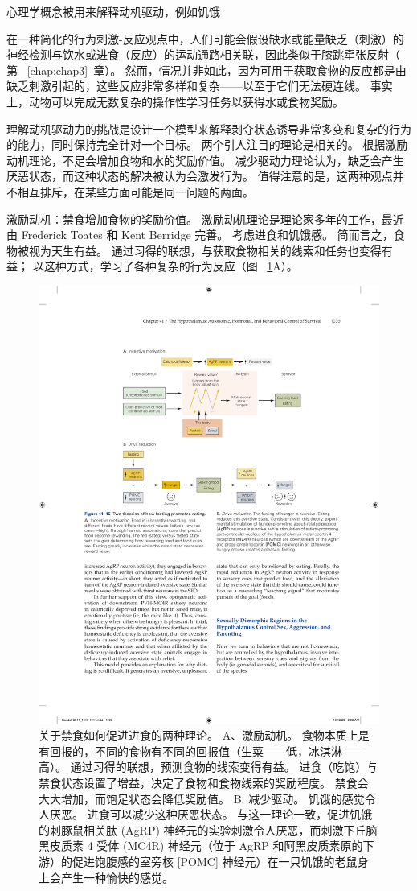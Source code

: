 心理学概念被用来解释动机驱动，例如饥饿

在一种简化的行为刺激-反应观点中，人们可能会假设缺水或能量缺乏（刺激）的神经检测与饮水或进食（反应）的运动通路相关联，因此类似于膝跳牵张反射（ 第 ~\ref{chap:chap3}~章）。
然而，情况并非如此，因为可用于获取食物的反应都是由缺乏刺激引起的，这些反应非常多样和复杂——以至于它们无法硬连线。
事实上，动物可以完成无数复杂的操作性学习任务以获得水或食物奖励。


理解动机驱动力的挑战是设计一个模型来解释剥夺状态诱导非常多变和复杂的行为的能力，同时保持完全针对一个目标。 两个引人注目的理论是相关的。
根据激励动机理论，不足会增加食物和水的奖励价值。 减少驱动力理论认为，缺乏会产生厌恶状态，而这种状态的解决被认为会激发行为。
值得注意的是，这两种观点并不相互排斥，在某些方面可能是同一问题的两面。


激励动机：禁食增加食物的奖励价值。
激励动机理论是理论家多年的工作，最近由 Frederick Toates 和 Kent Berridge 完善。
考虑进食和饥饿感。
简而言之，食物被视为天生有益。
通过习得的联想，与获取食物相关的线索和任务也变得有益；
以这种方式，学习了各种复杂的行为反应（图 ~\ref{fig:41_15}A）。


\begin{figure}[htbp]
	\centering
	\includegraphics[width=0.75\linewidth]{chap41/fig_41_15}
	\caption{关于禁食如何促进进食的两种理论。 
		A、激励动机。 食物本质上是有回报的，不同的食物有不同的回报值（生菜——低，冰淇淋——高）。 通过习得的联想，预测食物的线索变得有益。 进食（吃饱）与禁食状态设置了增益，决定了食物和食物线索的奖励程度。 禁食会大大增加，而饱足状态会降低奖励值。 B. 减少驱动。 饥饿的感觉令人厌恶。 进食可以减少这种厌恶状态。 与这一理论一致，促进饥饿的刺豚鼠相关肽 (AgRP) 神经元的实验刺激令人厌恶，而刺激下丘脑黑皮质素 4 受体 (MC4R) 神经元（位于 AgRP 和阿黑皮质素原的下游）的促进饱腹感的室旁核 [POMC] 神经元）在一只饥饿的老鼠身上会产生一种愉快的感觉。}
	\label{fig:41_15}
\end{figure}


